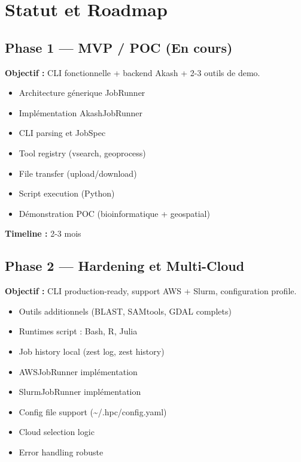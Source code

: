 \documentclass[11pt,a4paper]{article}
\begin{document}
	\section{Statut et Roadmap}
	
	\subsection{Phase 1 --- MVP / POC (En cours)}
	
	\textbf{Objectif :} CLI fonctionnelle + backend Akash + 2-3 outils de demo.
	
	\begin{itemize}
		\item[$\checkmark$] Architecture génerique JobRunner
		\item[$\checkmark$] Implémentation AkashJobRunner
		\item[$\checkmark$] CLI parsing et JobSpec
		\item[$\checkmark$] Tool registry (vsearch, geoprocess)
		\item[$\checkmark$] File transfer (upload/download)
		\item[$\checkmark$] Script execution (Python)
		\item[\,-] Démonstration POC (bioinformatique + geospatial)
	\end{itemize}
	
	\textbf{Timeline :} 2-3 mois
	
	\subsection{Phase 2 --- Hardening et Multi-Cloud}
	
	\textbf{Objectif :} CLI production-ready, support AWS + Slurm, configuration profile.
	
	\begin{itemize}
		\item[\,-] Outils additionnels (BLAST, SAMtools, GDAL complets)
		\item[\,-] Runtimes script : Bash, R, Julia
		\item[\,-] Job history local (zest log, zest history)
		\item[\,-] AWSJobRunner implémentation
		\item[\,-] SlurmJobRunner implémentation
		\item[\,-] Config file support (\textasciitilde/.hpc/config.yaml)
		\item[\,-] Cloud selection logic
		\item[\,-] Error handling robuste
	\end{itemize}
	
\end{document}
